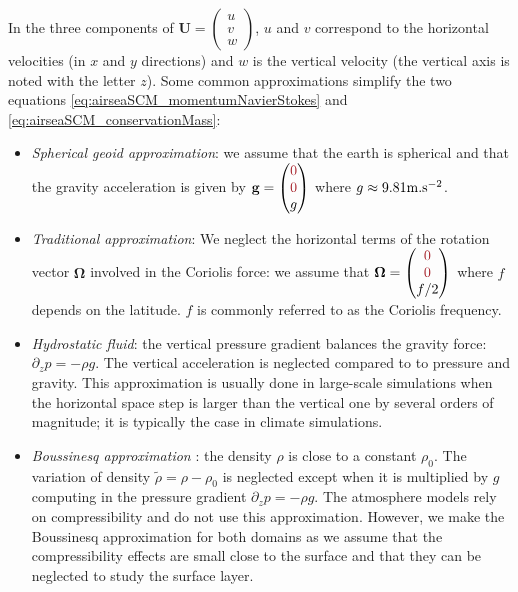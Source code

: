 In the three components of
$\mathbf{U} = \begin{pmatrix}u\\v\\w\end{pmatrix}$, $u$ and $v$
correspond to the horizontal velocities (in $x$ and $y$ directions)
and $w$ is the vertical velocity (the vertical axis is noted
with the letter $z$).
Some common approximations simplify the two equations
\eqref{eq:airseaSCM_momentumNavierStokes} and
\eqref{eq:airseaSCM_conservationMass}:
\begin{itemize}
\item \textit{Spherical geoid approximation}:
we assume that the earth is spherical and that the
gravity acceleration is given by
$\mathbf{g} =\begin{pmatrix}
	\emphase{0}\\ \emphase{0} \\ g
\end{pmatrix}$ where $g\approx 9.81 {\rm m}.{\rm s}^{-2}$.
\item \textit{Traditional approximation}:
We neglect the horizontal terms of
the rotation vector $\mathbf{\Omega}$
involved in the Coriolis force: we assume that
$\mathbf{\Omega} =\begin{pmatrix}
	\emphase{0}\\ \emphase{0} \\ f/2
\end{pmatrix}$ where $f$ depends on the latitude.
$f$ is commonly referred to as the Coriolis frequency.
\item \textit{Hydrostatic fluid}:
the vertical pressure gradient balances the gravity force:
$\partial_z p = -\rho g$. The vertical
acceleration is neglected compared to to pressure and gravity.
This approximation is usually done in large-scale simulations
when the horizontal
space step is larger than the vertical one by several orders
of magnitude; it is typically the case in climate simulations.
\item \textit{Boussinesq approximation}
\citep{boussinesq_theorie_1903}:
the density $\rho$ is close to a constant $\rho_0$.
The variation of density $\widetilde{\rho} =
\rho - \rho_0$ is neglected except when it is multiplied by $g$
computing in the pressure gradient $\partial_z p = - \rho g$.
The atmosphere models rely on compressibility and
do not use this approximation. However, we make
the Boussinesq approximation for both domains
as we assume that the compressibility effects
are small close to the surface and that they
can be neglected to study the surface layer.
\end{itemize}
